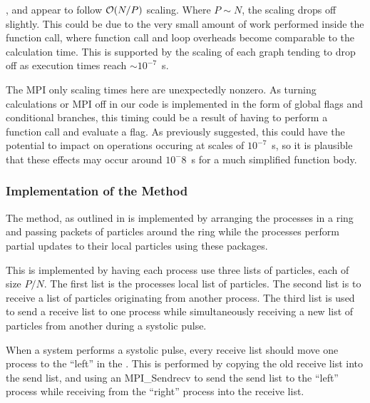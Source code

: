 \vZeroTimeExplanation
    {}
    {}
    {}
    {\individualoperation{}}
    {\systolicloop{}}

,
 and
appear to follow $\mathcal{O}{\left({ N/P }\right)}$ scaling.
%
Where $P \sim{} N$, the scaling drops off slightly.
%
This could be due to the very small amount of work performed
inside the function call, where function call and loop overheads
become comparable to the calculation time.
%
This is supported by the scaling of each graph tending to drop off
as execution times reach $\sim{} 10^{-7}$~s.

The MPI only scaling times here are unexpectedly nonzero.
%
As turning calculations or MPI off in our code is implemented in
the form of global flags and conditional branches, this timing
could be a result of having to perform a function call and
evaluate a flag.
%
As previously suggested, this could have the potential to impact on
operations occuring at scales of $10^{-7}$~s, so it is plausible
that these effects may occur around $10^-{8}$~s for a much simplified
function body.


%
%

\subsubsection{Implementation of the \pairoperation{} Method}

The \pairoperation{} method, as outlined in 
is implemented by arranging the processes in a ring and passing
packets of particles around the ring while the processes perform
partial updates to their local particles using these packages.

This is implemented by having each process use three lists of particles,
each of size $P/N$.
%
The first list is the processes local list of particles.
%
The second list is to receive a list of particles originating from
another process.
%
The third list is used to send a receive list
to one process while simultaneously receiving a new
list of particles from another
during a systolic pulse.

When a system performs a systolic pulse,
every receive list should move one process
to the ``left'' in the \systolicloop{}.
%
This is performed by copying the old receive list into the
send list, and using an MPI\_Sendrecv to send the send list to
the ``left'' process while receiving from
the ``right'' process into the receive list.

